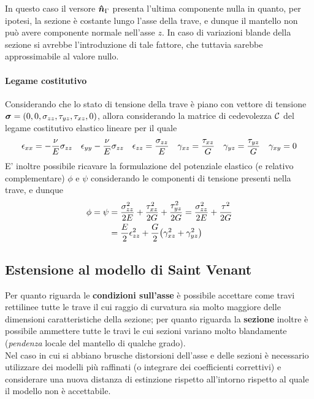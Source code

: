 		\begin{nota}
			In questo caso il versore $\boldsymbol{\hat{n}}_\Gamma$ presenta l'ultima componente nulla in quanto, per ipotesi, la sezione è costante lungo l'asse della trave, e dunque il mantello non può avere componente normale nell'asse $z$. In caso di variazioni blande della sezione si avrebbe l'introduzione di tale fattore, che tuttavia sarebbe approssimabile al valore nullo.
		\end{nota}
		
		\paragraph{Legame costitutivo} Considerando che lo stato di tensione della trave è piano con vettore di tensione $\boldsymbol{\sigma}= (0,0,\sigma_{zz},\tau_{yz},\tau_{xz},0)$, allora considerando la matrice di cedevolezza $\mathcal C$ del legame costitutivo elastico lineare per il quale
		\[ \epsilon_{xx} = - \frac \nu E \sigma_{zz} \quad \epsilon_{yy} -\frac \nu E \sigma_{zz} \quad \epsilon_{zz} = \frac {\sigma_{zz}} E \quad \gamma_{xz} = \frac {\tau_{xz}} G \quad \gamma_{yz} = \frac {\tau_{yz}} G \quad \gamma_{xy} = 0  \]
		E' inoltre possibile ricavare la formulazione del potenziale elastico (e relativo complementare) $\phi$ e $\psi$ considerando le componenti di tensione presenti nella trave, e dunque
		\begin{align*}
			\phi = \psi & = \frac{\sigma_{zz}^2}{2E} + \frac{\tau_{xz}^2}{2G} + \frac{\tau_{yz}^2}{2G} = \frac{\sigma_{zz}^2}{2E} + \frac{\tau^2}{2G} \\ 
			& = \frac E 2 \epsilon_{zz}^2 + \frac G 2 \big(\gamma_{xz}^2 + \gamma_{yz}^2\big)
		\end{align*}
		
	\subsection{Estensione al modello di Saint Venant}
		Per quanto riguarda le \textbf{condizioni sull'asse} è possibile accettare come travi rettilinee tutte le trave il cui raggio di curvatura sia molto maggiore delle dimensioni caratteristiche della sezione; per quanto riguarda la \textbf{sezione} inoltre è possibile ammettere tutte le travi le cui sezioni variano molto blandamente (\textit{pendenza} locale del mantello di qualche grado). \\
		Nel caso in cui si abbiano brusche distorsioni dell'asse e delle sezioni è necessario utilizzare dei modelli più raffinati (o integrare dei coefficienti correttivi) e considerare una nuova distanza di estinzione rispetto all'intorno rispetto al quale il modello non è accettabile.
		

